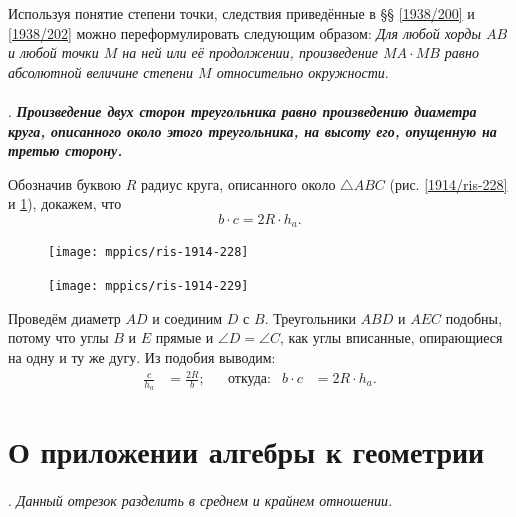 \documentclass[twoside]{book}
\begin{document}
Используя понятие степени точки, следствия приведённые в §§ \ref{1938/200} и \ref{1938/202} можно переформулировать следующим образом:
\emph{Для любой хорды $AB$ и любой точки $M$ на ней или её продолжении, произведение $MA\cdot MB$ равно абсолютной величине степени $M$ относительно окружности}.

\paragraph{}\label{1914/250}. \textbf{\emph{Произведение двух сторон треугольника равно произведению диаметра круга, описанного около этого треугольника, на высоту его, опущенную на третью сторону.}}

Обозначив буквою $R$ радиус круга, описанного около $\triangle ABC$ (рис. \ref{1914/ris-228} и \ref{1914/ris-229}), докажем, что
\[b\cdot c=2R\cdot h_a.\]

\begin{figure}[h!]
\begin{minipage}{.48\textwidth}
\centering
\texttt{[image: mppics/ris-1914-228]}
\end{minipage}
\hfill
\begin{minipage}{.48\textwidth}
\centering
\texttt{[image: mppics/ris-1914-229]}
\end{minipage}

\medskip

\begin{minipage}{.48\textwidth}
\centering
\caption{}\label{1914/ris-228}
\end{minipage}
\hfill
\begin{minipage}{.48\textwidth}
\centering
\caption{}\label{1914/ris-229}
\end{minipage}
\vskip-4mm
\end{figure}

Проведём диаметр $AD$ и соединим $D$ с $B$.
Треугольники $ABD$ и $AEC$ подобны, потому что углы $B$ и $E$ прямые и $\angle D=\angle C$, как углы вписанные, опирающиеся на одну и ту же дугу.
Из подобия выводим:
\begin{align*}
\frac{c}{h_a}&=\frac{2R}{b};
&&\text{откуда:}
&b\cdot c&=2R\cdot h_a.
\end{align*}

\section{О приложении алгебры к геометрии}

\paragraph{}\label{1938/209}
.
\emph{Данный отрезок разделить в среднем и крайнем отношении.}
\end{document}
